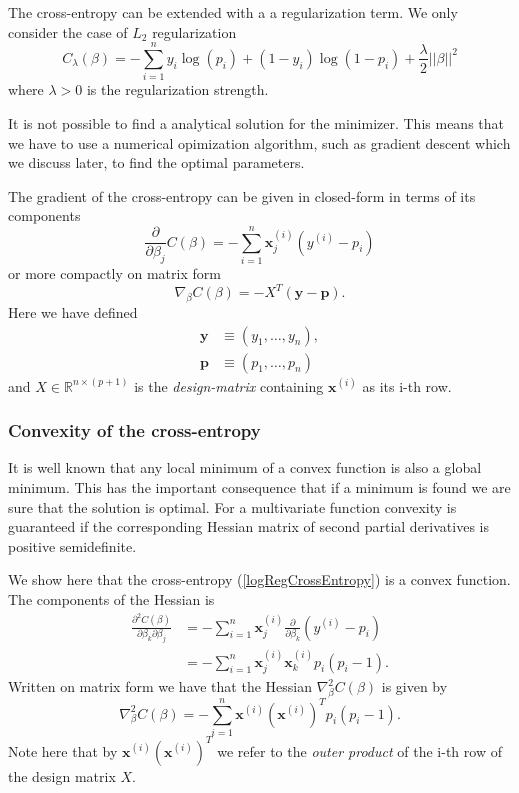 \documentclass[a4paper, twocolumn]{article}
\begin{document}
The cross-entropy can be extended with a 
a regularization term. We only consider the case of $L_2$ regularization
\begin{equation}
 C_\lambda (\beta) = -\sum_{i=1}^n y_i \log(p_i) + (1-y_i) \log(1-p_i) + \frac{\lambda}{2} ||\beta||^2 \label{reglogRegCrossEntropy}
\end{equation}
where $\lambda > 0$ is the regularization strength.

It is not possible to find a analytical solution for the minimizer. This means that we have to use a
numerical opimization algorithm, such as gradient descent which we discuss later, to find the optimal parameters.

The gradient of the cross-entropy can be given in closed-form in terms of its components
\begin{equation}
 \frac{\partial}{\partial \beta_j} C(\beta) = - \sum_{i=1}^n \mathbf{x}_j^{(i)} \left( y^{(i)} - p_i \right)
\end{equation}
or more compactly on matrix form
\begin{equation}
 \nabla_\beta C(\beta) = - X^{T} \left( \mathbf{y} - \mathbf{p} \right). 
\end{equation}
Here we have defined \begin{align}
\mathbf{y} &\equiv (y_1,\dots,y_n), \\       
      \mathbf{p} &\equiv \left( p_1,\dots,p_n \right)
      \end{align}
and $X \in \mathbb{R}^{n \times (p+1)}$ is the \textit{design-matrix} containing $\mathbf{x}^{(i)}$ as its i-th row.
\subsubsection{Convexity of the cross-entropy}
It is well known that any local minimum of a convex function is also a global minimum. This has the important consequence 
that if a minimum is found we are sure that the solution is optimal. For a multivariate function convexity is guaranteed 
if the corresponding Hessian matrix of second partial derivatives is positive semidefinite.

We show here that the cross-entropy (\ref{logRegCrossEntropy}) is a convex function. 
The components of the Hessian is 
\begin{align*}
 \frac{\partial^2C(\beta)}{ \partial \beta_k \partial \beta_j}  &= - \sum_{i=1}^n \mathbf{x}_j^{(i)} \frac{\partial}{\partial \beta_k} \left( y^{(i)} - p_i \right) \\
 &= - \sum_{i=1}^n \mathbf{x}_j^{(i)} \mathbf{x}_k^{(i)} p_i(p_i-1).
\end{align*}
Written on matrix form we have that the Hessian $\nabla^2_\beta C(\beta)$ is given by
\begin{equation}
 \nabla^2_\beta C(\beta) = -\sum_{i=1}^n \mathbf{x}^{(i)} (\mathbf{x}^{(i)})^T p_i (p_i-1).
\end{equation}
Note here that by $\mathbf{x}^{(i)} (\mathbf{x}^{(i)})^T$ we refer to the \textit{outer product} of the i-th row of the design matrix 
$X$.
\end{document}
